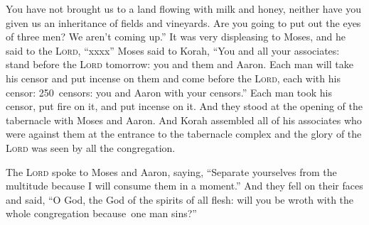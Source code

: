 \begin{inparaenum}
   You have not brought us to a land flowing with milk and honey, neither have you given us an inheritance of fields and vineyards. Are you going to put out the eyes of three men? We aren't coming up.''%
   It was very displeasing to Moses, and he said to the \textsc{Lord}, ``xxxx''%
   Moses said to Korah, ``You and all your associates: stand before the \textsc{Lord} tomorrow: you and them and Aaron.%
   Each man will take his censor and put incense on them and come before the \textsc{Lord}, each with his censor: 250~censors: you and Aaron with your censors.''%
   Each man took his censor, put fire on it, and put incense on it. And they stood at the opening of the tabernacle with Moses and Aaron.%
   And Korah assembled all of his associates who were against them at the entrance to the tabernacle complex and the glory of the \textsc{Lord} was seen by all the congregation.%
  
   The \textsc{Lord} spoke to Moses and Aaron, saying,%
   ``Separate yourselves from the multitude because I will consume them in a moment.''%
   And they fell on their faces and said, ``O God, the God of the spirits of all flesh: will you be wroth with the whole congregation because\understood\ one man sins?''%
  

\end{inparaenum}
